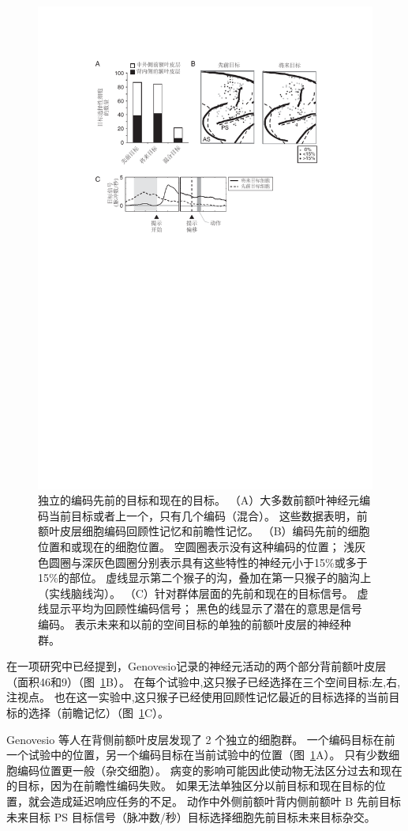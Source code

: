 \begin{figure}
	\centering
	\includegraphics[width=0.7\linewidth]{chap6/6_7}
	\caption{独立的编码先前的目标和现在的目标。
		（A）大多数前额叶神经元编码当前目标或者上一个，只有几个编码（混合）。
		这些数据表明，前额叶皮层细胞编码回顾性记忆和前瞻性记忆。
		（B）编码先前的细胞位置和或现在的细胞位置。
		空圆圈表示没有这种编码的位置；
		浅灰色圆圈与深灰色圆圈分别表示具有这些特性的神经元小于15\%或多于15\%的部位。
		虚线显示第二个猴子的沟，叠加在第一只猴子的脑沟上（实线脑线沟）。
		（C）针对群体层面的先前和现在的目标信号。
		虚线显示平均为回顾性编码信号；
		黑色的线显示了潜在的意思是信号编码\cite{genovesio2006representation}。
		表示未来和以前的空间目标的单独的前额叶皮层的神经种群。}
	\label{fig:6_7}
\end{figure}


在一项研究中已经提到，Genovesio\cite{genovesio2006representation}记录的神经元活动的两个部分背前额叶皮层（面积46和9）（图~\ref{fig:6_7}B）。
在每个试验中,这只猴子已经选择在三个空间目标:左,右,注视点。
也在这一实验中,这只猴子已经使用回顾性记忆最近的目标选择的当前目标的选择（前瞻记忆）（图~\ref{fig:6_7}C）。


Genovesio 等人在背侧前额叶皮层发现了 2 个独立的细胞群。
一个编码目标在前一个试验中的位置，另一个编码目标在当前试验中的位置（图~\ref{fig:6_7}A）。
只有少数细胞编码位置更一般（杂交细胞）。
病变的影响可能因此使动物无法区分过去和现在的目标，因为在前瞻性编码失败。
如果无法单独区分以前目标和现在目标的位置，就会造成延迟响应任务的不足。
动作中外侧前额叶背内侧前额叶 B 先前目标未来目标 PS 目标信号（脉冲数/秒）目标选择细胞先前目标未来目标杂交。


